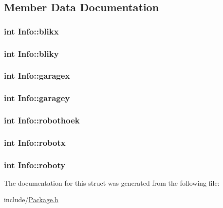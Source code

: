 \subsection{Member Data Documentation}
\hypertarget{structInfo_ab75b1c67a0eb23774acc62ee53e8d6a9}{
\subsubsection[{blikx}]{\setlength{\rightskip}{0pt plus 5cm}int Info\-::blikx}}\label{structInfo_ab75b1c67a0eb23774acc62ee53e8d6a9}
\hypertarget{structInfo_a4abe3b1c4272e0596bd17630baf3eab6}{
\subsubsection[{bliky}]{\setlength{\rightskip}{0pt plus 5cm}int Info\-::bliky}}\label{structInfo_a4abe3b1c4272e0596bd17630baf3eab6}
\hypertarget{structInfo_a3138ebfa6837af8a395731f1e1cd8f5a}{
\subsubsection[{garagex}]{\setlength{\rightskip}{0pt plus 5cm}int Info\-::garagex}}\label{structInfo_a3138ebfa6837af8a395731f1e1cd8f5a}
\hypertarget{structInfo_a8fffb2565daace7a478fb371d51d8d64}{
\subsubsection[{garagey}]{\setlength{\rightskip}{0pt plus 5cm}int Info\-::garagey}}\label{structInfo_a8fffb2565daace7a478fb371d51d8d64}
\hypertarget{structInfo_a452cf47140c5cc9a2bdaf68012abb0dd}{
\subsubsection[{robothoek}]{\setlength{\rightskip}{0pt plus 5cm}int Info\-::robothoek}}\label{structInfo_a452cf47140c5cc9a2bdaf68012abb0dd}
\hypertarget{structInfo_a61295f0c91f3af22416337bee785a9c2}{
\subsubsection[{robotx}]{\setlength{\rightskip}{0pt plus 5cm}int Info\-::robotx}}\label{structInfo_a61295f0c91f3af22416337bee785a9c2}
\hypertarget{structInfo_a2dacc6919a0cc7f80da3dc6db7588dd2}{
\subsubsection[{roboty}]{\setlength{\rightskip}{0pt plus 5cm}int Info\-::roboty}}\label{structInfo_a2dacc6919a0cc7f80da3dc6db7588dd2}


The documentation for this struct was generated from the following file\-:\begin{DoxyCompactItemize}
\item 
include/\hyperlink{Package_8h}{Package.\-h}\end{DoxyCompactItemize}
